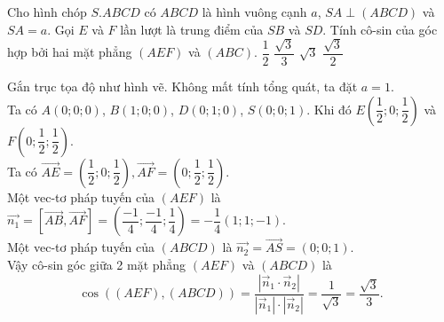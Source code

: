 \begin{ex}%
Cho hình chóp $S.ABCD$ có $ABCD$ là hình vuông cạnh $a$, $SA\perp\left(ABCD\right)$ và $SA=a$. Gọi $E$ và $F$ lần lượt là trung điểm của $SB$ và $SD$. Tính cô-sin của góc hợp bởi hai mặt phẳng $\left(AEF\right)$ và $\left(ABC\right)$.
\choice
{$\dfrac{1}{2}$}
{\True $\dfrac{\sqrt{3}}{3}$}
{$\sqrt{3}$}
{$\dfrac{\sqrt{3}}{2}$}
\loigiai
{
\begin{center}
\end{center}
Gắn trục tọa độ như hình vẽ. Không mất tính tổng quát, ta đặt $a=1$.\\
Ta có $A\left(0;0;0\right)$, $B\left(1;0;0\right)$, $D\left(0;1;0\right)$, $S\left(0;0;1\right)$. Khi đó $E\left(\dfrac{1}{2};0;\dfrac{1}{2}\right)$ và $F\left(0;\dfrac{1}{2};\dfrac{1}{2}\right)$.\\
Ta có $\overrightarrow{A E}=\left(\dfrac{1}{2} ; 0 ; \dfrac{1}{2}\right), \overrightarrow{A F}=\left(0 ; \dfrac{1}{2} ; \dfrac{1}{2}\right)$.\\
Một vec-tơ pháp tuyến của $(A E F)$ là $\overrightarrow{n_1}=\left[\overrightarrow{A B}, \overrightarrow{A F}\right]=\left(\dfrac{-1}{4} ; \dfrac{-1}{4} ; \dfrac{1}{4}\right) =-\dfrac{1}{4}(1 ; 1 ;-1)$.\\
Một vec-tơ pháp tuyến của $(A B C D)$ là  $\overrightarrow{n_2}=\overrightarrow{A S}=(0 ; 0 ; 1)$.\\
Vậy cô-sin góc giữa 2 mặt phẳng $(A E F)$ và $(A B C D)$ là
\[
\cos ((A E F),(A B C D))=\dfrac{\left|\overrightarrow{n}_1 \cdot \overrightarrow{n}_2\right|}{\left|\overrightarrow{n}_1\right| \cdot\left|\overrightarrow{n}_2\right|}=\dfrac{1}{\sqrt{3}}=\dfrac{\sqrt{3}}{3}.
\]
}
\end{ex}

